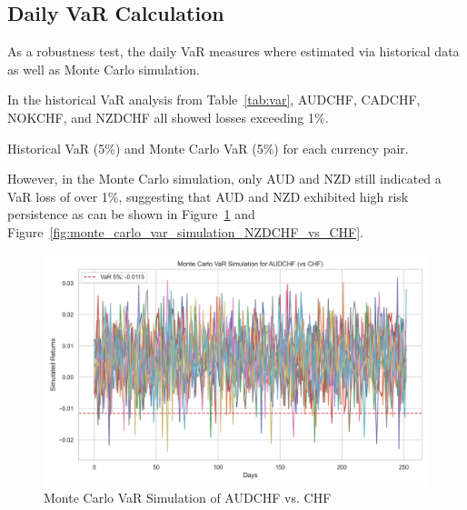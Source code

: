\documentclass{article}
\begin{document}
\subsection{Daily VaR Calculation}
As a robustness test, the daily VaR measures where estimated via historical data as well as Monte Carlo simulation.

In the historical VaR analysis from Table~\ref{tab:var}, AUDCHF, CADCHF, NOKCHF, and NZDCHF all showed losses exceeding 1\%. 

\begin{table}[H]
\centering
\caption{Historical VaR (5\%) and Monte Carlo VaR (5\%) for each currency pair.} 
\label{tab:var}
\end{table}

However, in the Monte Carlo simulation, only AUD and NZD still indicated a VaR loss of over 1\%, suggesting that AUD and NZD exhibited high risk persistence as can be shown in Figure~\ref{fig:monte_carlo_var_simulation_AUDCHF_vs_CHF} and Figure~\ref{fig:monte_carlo_var_simulation_NZDCHF_vs_CHF}.

\begin{figure}[H]
    \centering   
    \includegraphics[width=0.75\linewidth]{../../reports/figures/monte_carlo_var_simulation_AUDCHF_vs_CHF.png}
    \caption{Monte Carlo VaR Simulation of AUDCHF vs. CHF}  \label{fig:monte_carlo_var_simulation_AUDCHF_vs_CHF}
\end{figure}
\end{document}
